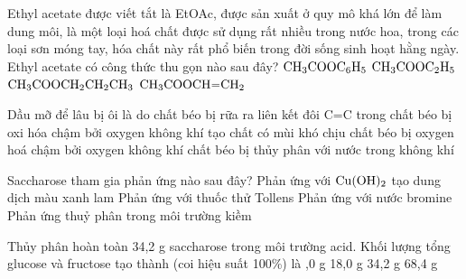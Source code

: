 \documentclass[11pt,a4paper]{article}
\begin{document}
\begin{ex}
Ethyl acetate được viết tắt là EtOAc, được sản xuất ở quy mô khá lớn để làm dung môi, là một loại hoá chất được sử dụng rất nhiều trong nước hoa, trong các loại sơn móng tay, hóa chất này rất phổ biến trong đời sống sinh hoạt hằng ngày. Ethyl acetate có công thức thu gọn nào sau đây?
\choice
{$\ce{CH3COOC6H5}$}
{\True $\ce{CH3COOC2H5}$}
{$\ce{CH3COOCH2CH2CH3}$}
{$\ce{CH3COOCH=CH2}$}



\end{ex}

\begin{ex}
Dầu mỡ để lâu bị ôi là do
\choice
{chất béo bị rữa ra}
{\True liên kết đôi C=C trong chất béo bị oxi hóa chậm bởi oxygen không khí tạo chất có mùi khó chịu}
{chất béo bị oxygen hoá chậm bởi oxygen không khí}
{chất béo bị thủy phân với nước trong không khí}



\end{ex}

\begin{ex}
Saccharose tham gia phản ứng nào sau đây?
\choice
{\True Phản ứng với $\ce{Cu(OH)2}$ tạo dung dịch màu xanh lam}
{Phản ứng với thuốc thử Tollens}
{Phản ứng với nước bromine}
{Phản ứng thuỷ phân trong môi trường kiềm}



\end{ex}

\begin{ex}
Thủy phân hoàn toàn 34,2 g saccharose trong môi trường acid. Khối lượng tổng glucose và fructose tạo thành (coi hiệu suất 100\%) là
\choice
{,0 g}
{18,0 g}
{34,2 g}
{68,4 g}



\end{ex}
\end{document}
